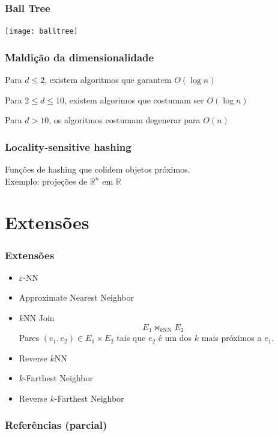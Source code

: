 \documentclass[utf8]{beamer}
\begin{document}
\begin{frame}
    \frametitle{Ball Tree}
    \centering
    \texttt{[image: balltree]}
\end{frame}

\begin{frame}
    \frametitle{Maldição da dimensionalidade}

    Para $d \leq 2$, existem algoritmos que garantem $O(\log n)$

    Para $2 \leq d \leq 10$, existem algorimos que costumam ser $O(\log n)$

    Para $d > 10$, os algoritmos costumam degenerar para $O(n)$

    \nocite{masterThesis} %
\end{frame}

\begin{frame}
    \frametitle{Locality-sensitive hashing}

    Funções de hashing que colidem objetos próximos.
    \\[1em]
    Exemplo: projeções de $\mathbb R^n$ em $\mathbb R$
\end{frame}

\section{Extensões}

\begin{frame}
    \frametitle{Extensões}
    \begin{itemize}
        \item $\varepsilon$-NN
        \item Approximate Nearest Neighbor
        \item $k$NN Join
            \begin{equation*}
                E_1 \Join_{k\mathrm{NN}} E_2
            \end{equation*}
            Pares $(e_1, e_2) \in E_1 \times E_2$ tais que
            $e_2$ é um dos $k$ mais próximos a $e_1$.
        \item Reverse $k$NN \nocite{reverseNN}
        \item $k$-Farthest Neighbor
        \item Reverse $k$-Farthest Neighbor
    \end{itemize}
\end{frame}

\begin{frame}
    \frametitle{Referências (parcial)}
    
    
\end{frame}
\end{document}
